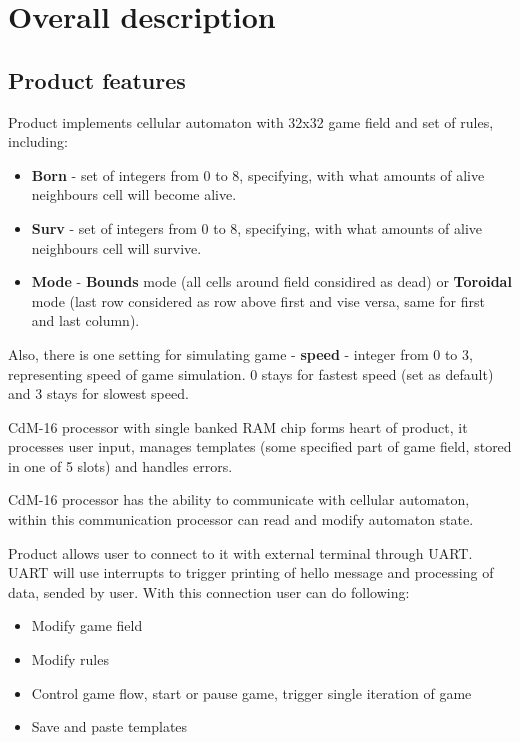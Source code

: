 \chapter*{Overall description}

\section*{Product features}

Product implements cellular automaton with 32x32 game field and set of rules, including:

\begin{itemize}
	\item \textbf{Born} - set of integers from 0 to 8, specifying, with what amounts of alive neighbours cell will become alive.
	\item \textbf{Surv} - set of integers from 0 to 8, specifying, with what amounts of alive neighbours cell will survive.
	\item \textbf{Mode} - \textbf{Bounds} mode (all cells around field considired as dead) or \textbf{Toroidal} mode (last row considered as row above first and vise versa, same for first and last column).
\end{itemize}

Also, there is one setting for simulating game - \textbf{speed} - integer from 0 to 3, representing speed of game simulation. 0 stays for fastest speed (set as default) and 3 stays for slowest speed.

CdM-16 processor with single banked RAM chip forms heart of product, it processes user input, manages templates (some specified part of game field, stored in one of 5 slots) and handles errors.

CdM-16 processor has the ability to communicate with cellular automaton, within this communication processor can read and modify automaton state.

Product allows user to connect to it with external terminal through UART. UART will use interrupts to trigger printing of hello message and processing of data, sended by user. With this connection user can do following:

\begin{itemize}
	\item Modify game field
	\item Modify rules
	\item Control game flow, start or pause game, trigger single iteration of game
	\item Save and paste templates
\end{itemize}

